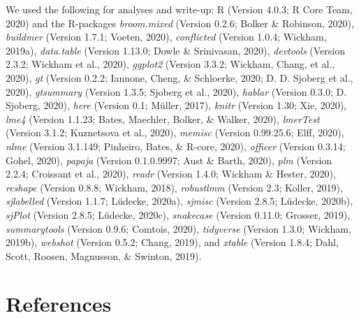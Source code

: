 \documentclass[
  english,
  man, noextraspace,floatsintext]{apa6}
\begin{document}
We used the following for analyses and write-up: R (Version 4.0.3; R Core Team, 2020) and the R-packages \emph{broom.mixed} (Version 0.2.6; Bolker \& Robinson, 2020), \emph{buildmer} (Version 1.7.1; Voeten, 2020), \emph{conflicted} (Version 1.0.4; Wickham, 2019a), \emph{data.table} (Version 1.13.0; Dowle \& Srinivasan, 2020), \emph{devtools} (Version 2.3.2; Wickham et al., 2020), \emph{ggplot2} (Version 3.3.2; Wickham, Chang, et al., 2020), \emph{gt} (Version 0.2.2; Iannone, Cheng, \& Schloerke, 2020; D. D. Sjoberg et al., 2020), \emph{gtsummary} (Version 1.3.5; Sjoberg et al., 2020), \emph{hablar} (Version 0.3.0; D. Sjoberg, 2020), \emph{here} (Version 0.1; Müller, 2017), \emph{knitr} (Version 1.30; Xie, 2020), \emph{lme4} (Version 1.1.23; Bates, Maechler, Bolker, \& Walker, 2020), \emph{lmerTest} (Version 3.1.2; Kuznetsova et al., 2020), \emph{memisc} (Version 0.99.25.6; Elff, 2020), \emph{nlme} (Version 3.1.149; Pinheiro, Bates, \& R-core, 2020), \emph{officer} (Version 0.3.14; Gohel, 2020), \emph{papaja} (Version 0.1.0.9997; Aust \& Barth, 2020), \emph{plm} (Version 2.2.4; Croissant et al., 2020), \emph{readr} (Version 1.4.0; Wickham \& Hester, 2020), \emph{reshape} (Version 0.8.8; Wickham, 2018), \emph{robustlmm} (Version 2.3; Koller, 2019), \emph{sjlabelled} (Version 1.1.7; Lüdecke, 2020a), \emph{sjmisc} (Version 2.8.5; Lüdecke, 2020b), \emph{sjPlot} (Version 2.8.5; Lüdecke, 2020c), \emph{snakecase} (Version 0.11.0; Grosser, 2019), \emph{summarytools} (Version 0.9.6; Comtois, 2020), \emph{tidyverse} (Version 1.3.0; Wickham, 2019b), \emph{webshot} (Version 0.5.2; Chang, 2019), and \emph{xtable} (Version 1.8.4; Dahl, Scott, Roosen, Magnusson, \& Swinton, 2019).

\newpage

\hypertarget{references}{%
\section{References}\label{references}}

\begingroup
\setlength{\parindent}{-0.5in}
\setlength{\leftskip}{0.5in}
\end{document}

